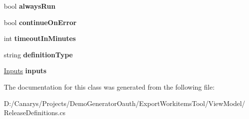\begin{DoxyCompactItemize}
bool {\bfseries always\+Run}
\item 
\mbox{\label{class_templates_generator_tool_1_1_view_model_1_1_release_definitions_1_1_task_ace43f136a32fb9863d927c08fd43b92c}} 
bool {\bfseries continue\+On\+Error}
\item 
\mbox{\label{class_templates_generator_tool_1_1_view_model_1_1_release_definitions_1_1_task_abc2e5f2fd65201a622c1a452e726494a}} 
int {\bfseries timeout\+In\+Minutes}
\item 
\mbox{\label{class_templates_generator_tool_1_1_view_model_1_1_release_definitions_1_1_task_ae3b71c88b17ca448e5b93dad8b2f4b20}} 
string {\bfseries definition\+Type}
\item 
\mbox{\label{class_templates_generator_tool_1_1_view_model_1_1_release_definitions_1_1_task_a23bc3f4927d21fd2557f7ab7851d2a74}} 
\mbox{\hyperlink{class_templates_generator_tool_1_1_view_model_1_1_release_definitions_1_1_inputs}{Inputs}} {\bfseries inputs}
\end{DoxyCompactItemize}


The documentation for this class was generated from the following file\+:\begin{DoxyCompactItemize}
\item 
D\+:/\+Canarys/\+Projects/\+Demo\+Generator\+Oauth/\+Export\+Workitems\+Tool/\+View\+Model/Release\+Definitions.\+cs\end{DoxyCompactItemize}
